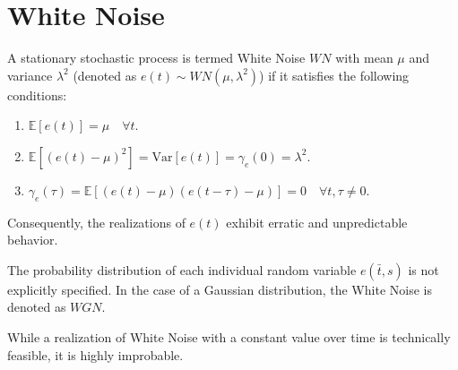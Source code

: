 \section{White Noise}

\begin{definition}
    A stationary stochastic process is termed White Noise $WN$ with mean $\mu$ and variance $\lambda^2$ (denoted as $e(t)\sim WN(\mu,\lambda^2)$) if it satisfies the following conditions:
\end{definition}
\begin{enumerate}
    \item $\mathbb{E}\left[e(t)\right]=\mu \quad \forall t$. 
    \item $\mathbb{E}\left[{\left(e(t)-\mu\right)}^2\right]=\text{Var}\left[e(t)\right]=\gamma_e(0)=\lambda^2$. 
    \item $\gamma_e(\tau)=\mathbb{E}\left[ \left(e(t)-\mu\right)\left(e(t-\tau)-\mu\right) \right]=0 \quad \forall t,\tau \neq 0$. 
\end{enumerate}
Consequently, the realizations of $e(t)$ exhibit erratic and unpredictable behavior.

The probability distribution of each individual random variable $e(\bar{t},s)$ is not explicitly specified.
In the case of a Gaussian distribution, the White Noise is denoted as $WGN$.

While a realization of White Noise with a constant value over time is technically feasible, it is highly improbable.
